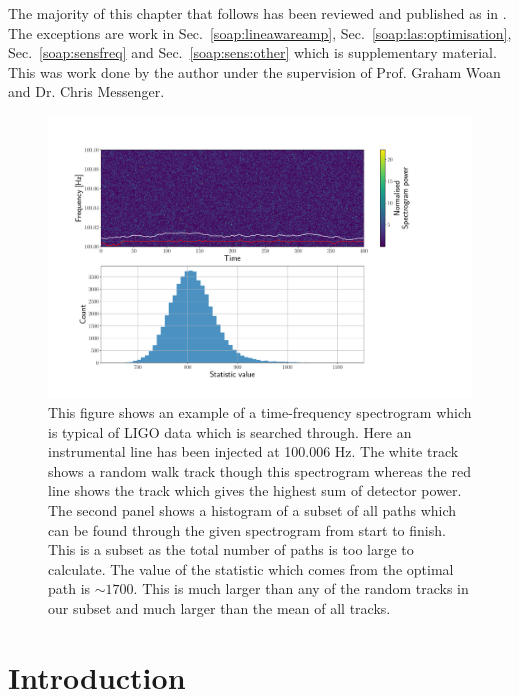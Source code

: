The majority of this chapter that follows has been reviewed and published as in
\citep{bayley2019GeneralizedApplication}.  The
exceptions are work in Sec.~\ref{soap:lineawareamp},
Sec.~\ref{soap:las:optimisation}, Sec.~\ref{soap:sensfreq} and
Sec.~\ref{soap:sens:other} which is supplementary material.
This was work done by the author
under the supervision of Prof. Graham Woan and Dr. Chris Messenger.


\begin{figure}[ht]

\centering
\includegraphics[width=\linewidth]{C3_soap/soap_spect_motivation.pdf}
\caption[Example of frequency tracks through a spectrogram and their summed power.]{This figure shows an example of a time-frequency spectrogram which is typical of \gls{LIGO} data which is searched through. Here an instrumental line has been injected at 100.006 Hz. The white track shows a random walk track though this spectrogram whereas the red line shows the track which gives the highest sum of detector power. The second panel shows a histogram of a subset of all paths which can be found through the given spectrogram from start to finish. This is a subset as the total number of paths is too large to calculate. The value of the statistic which comes from the optimal path is $\sim1700$. This is much larger than any of the random tracks in our subset and much larger than the mean of all tracks. }
\label{soap:motivation:plot}

\end{figure}

\section{Introduction}

